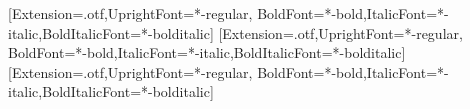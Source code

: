 %

\usepackage{fontspec}
\usepackage{polyglossia}
\providecommand{\limbaprincipala}{romanian}
\expandafter\setmainlanguage\expandafter{\limbaprincipala}
\usepackage{tikz}
\usepackage[most]{tcolorbox}
\usepackage{fontawesome5}
\usepackage{booktabs}
\usepackage{array}
\usepackage{ragged2e}
\usetikzlibrary{positioning,calc,arrows.meta,decorations.pathreplacing}


\setsansfont{texgyreheros}[Extension=.otf,UprightFont=*-regular,
  BoldFont=*-bold,ItalicFont=*-italic,BoldItalicFont=*-bolditalic]
\setmainfont{texgyreheros}[Extension=.otf,UprightFont=*-regular,
  BoldFont=*-bold,ItalicFont=*-italic,BoldItalicFont=*-bolditalic]
\newfontfamily{}[Extension=.otf,UprightFont=*-regular,
  BoldFont=*-bold,ItalicFont=*-italic,BoldItalicFont=*-bolditalic]
